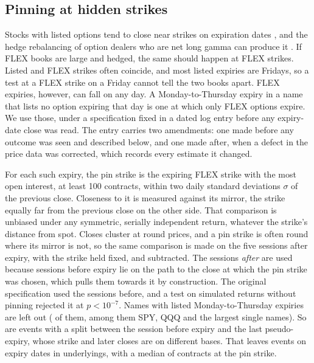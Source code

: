 \documentclass[11pt]{article}
\begin{document}
\subsection{Pinning at hidden strikes}
\label{sec:pinning}

Stocks with listed options tend to close near strikes on expiration dates
\citep{ni2005}, and the hedge rebalancing of option dealers who are net long gamma can
produce it \citep{avellaneda2003,golez2012}. If FLEX books are large and hedged, the same
should happen at FLEX strikes. Listed and FLEX strikes often coincide, and most listed
expiries are Fridays, so a test at a FLEX strike on a Friday cannot tell the two books
apart. FLEX expiries, however, can fall on any day. A Monday-to-Thursday expiry in a name
that lists no option expiring that day is one at which only FLEX options expire. We use
those, under a specification fixed in a dated log entry before any expiry-date close was
read. The entry carries two amendments: one made before any outcome was seen and
described below, and one made after, when a defect in the price data was corrected, which
records every estimate it changed.

For each such expiry, the pin strike is the expiring FLEX strike with the most open
interest, at least 100 contracts, within two daily standard deviations $\sigma$ of the
previous close. Closeness to it is measured against its mirror, the strike equally far
from the previous close on the other side. That comparison is unbiased under any
symmetric, serially independent return, whatever the strike's distance from spot. Closes cluster at round
prices, and a pin strike is often round where its mirror is not, so the same comparison
is made on the five sessions after expiry, with the strike held fixed, and subtracted.
The sessions \emph{after} are used because sessions before expiry lie on the path to the
close at which the pin strike was chosen, which pulls them towards it by construction.
The original specification used the sessions before, and a test on simulated returns
without pinning rejected it at $p<10^{-7}$. Names with listed Monday-to-Thursday expiries
are left out (\PinExcluded{} of them, among them SPY, QQQ and the largest single names).
So are \PinSplitDropped{} events with a split between the session before expiry and the
last pseudo-expiry, whose strike and later closes are on different bases. That leaves
\PinEvents{} events on \PinDates{} expiry dates in \PinUnderlyings{}
underlyings, with a median of \PinContracts{} contracts at the pin strike.
\end{document}
